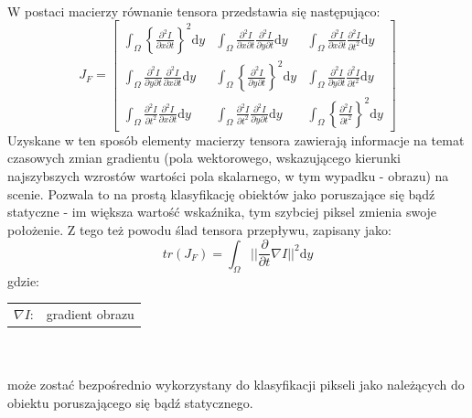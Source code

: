 \paragraph{}
W postaci macierzy równanie tensora przedstawia się następująco:
\begin{equation}
\label{eq:FT}
J_{F} =
\begin{bmatrix}
%
\int_\Omega \left\{\frac{\partial^2I}{\partial x\partial t}\right\}^2 \mathrm{d}y   &
%
\int_\Omega \frac{\partial^2I}{\partial x\partial t} \frac{\partial^2I}{\partial y\partial t} \mathrm{d}y  &
%
\int_\Omega \frac{\partial^2I}{\partial x\partial t} \frac{\partial^2I}{\partial t^2} \mathrm{d}y
\\[0.5em]
%
%
\int_\Omega \frac{\partial^2I}{\partial y\partial t} \frac{\partial^2I}{\partial x\partial t} \mathrm{d}y  &
%
\int_\Omega \left\{\frac{\partial^2I}{\partial y\partial t}\right\}^2 \mathrm{d}y   &
%
\int_\Omega \frac{\partial^2I}{\partial y\partial t} \frac{\partial^2I}{\partial t^2} \mathrm{d}y
\\[0.5em]
%
%
\int_\Omega \frac{\partial^2I}{\partial t^2} \frac{\partial^2I}{\partial x\partial t} \mathrm{d}y   &
%
\int_\Omega \frac{\partial^2I}{\partial t^2} \frac{\partial^2I}{\partial y\partial t} \mathrm{d}y   &
%
\int_\Omega \left\{\frac{\partial^2I}{\partial t^2}\right\}^2 \mathrm{d}y
\end{bmatrix}
\end{equation}
Uzyskane w ten sposób elementy macierzy tensora zawierają informacje na temat czasowych zmian gradientu (pola wektorowego, wskazującego kierunki najszybszych wzrostów wartości pola skalarnego, w tym wypadku - obrazu) na scenie. Pozwala to na prostą klasyfikację obiektów jako poruszające się bądź statyczne - im większa wartość wskaźnika, tym szybciej piksel zmienia swoje położenie. Z tego też powodu ślad tensora przepływu, zapisany jako:
\begin{equation}
tr(J_{F}) = 
\int_\Omega ||\frac{\partial}{\partial t}\nabla I||^2\mathrm{d}y
\end{equation}
gdzie:\\ 
\hspace*{3em}
\begin{tabular}{r p{}}
$\nabla I$: &  gradient obrazu
\end{tabular} \\
~\\
może zostać bezpośrednio wykorzystany do klasyfikacji pikseli jako należących do obiektu poruszającego się bądź statycznego.
